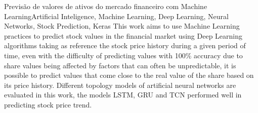 
\begin{englishabstract}{Previsão de valores de ativos do mercado financeiro com Machine Learning}{Artificial Inteligence, Machine Learning, Deep Learning, Neural Networks, Stock Prediction, Keras}
This work aims to use Machine Learning practices to predict stock values in the financial market using Deep Learning algorithms taking as reference the stock price history during a given period of time, even with the difficulty of predicting values with 100\% accuracy due to share values being affected by factors that can often be unpredictable, it is possible to predict values that come close to the real value of the share based on its price history. Different topology models of artificial neural networks are evaluated in this work, the models LSTM, GRU and TCN performed well in predicting stock price trend.
\end{englishabstract}